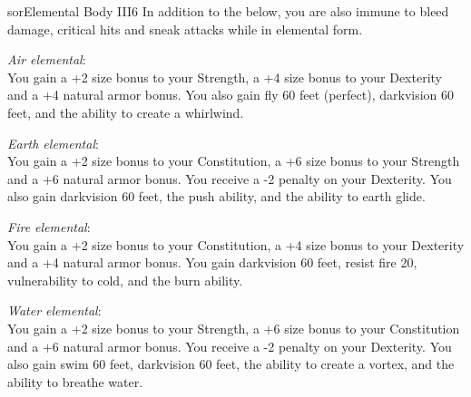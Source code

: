 \begin{spellcard}{sor}{Elemental Body III}{6}
  In addition to the below, you are also immune to bleed damage, critical hits and sneak attacks while in elemental form.

  \vfill{}
  \emph{Air elemental}:\\
  You gain a +2 size bonus to your Strength,
  a +4 size bonus to your Dexterity and a +4 natural armor bonus.
  You also gain fly 60 feet (perfect), darkvision 60 feet, and the ability to create a whirlwind.

  \emph{Earth elemental}:\\
  You gain a +2 size bonus to your Constitution,
  a +6 size bonus to your Strength and a +6 natural armor bonus.
  You receive a -2 penalty on your Dexterity.
  You also gain darkvision 60 feet, the push ability, and the ability to earth glide.

  \emph{Fire elemental}:\\
  You gain a +2 size bonus to your Constitution,
  a +4 size bonus to your Dexterity and a +4 natural armor bonus.
  You gain darkvision 60 feet, resist fire 20, vulnerability to cold, and the burn ability.

  \emph{Water elemental}:\\
  You gain a +2 size bonus to your Strength,
  a +6 size bonus to your Constitution and a +6 natural armor bonus.
  You receive a -2 penalty on your Dexterity.
  You also gain swim 60 feet, darkvision 60 feet, the ability to create a vortex, and the ability to breathe water.
\end{spellcard}
